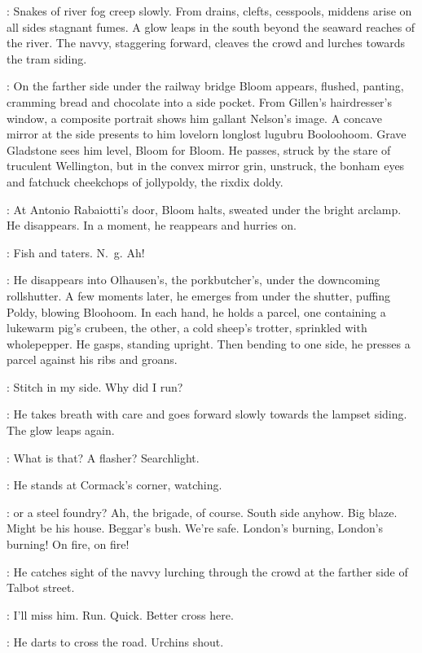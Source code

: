 :
Snakes of river fog creep slowly.
From drains,
clefts,
cesspools,
middens
arise on all sides stagnant fumes.
A glow leaps in the south
beyond the seaward reaches of the river.
The navvy,
staggering forward,
cleaves the crowd
and lurches towards the tram siding.

:
On the farther side under the railway bridge Bloom appears,
flushed,
panting,
cramming bread and chocolate into a side pocket.
From Gillen's hairdresser's window,
a composite portrait
shows him gallant Nelson's image.
A concave mirror at the side presents to him lovelorn longlost lugubru Booloohoom.
Grave Gladstone sees him level,
Bloom for Bloom.
He passes,
struck by the stare of truculent Wellington,
but in the convex mirror grin,
unstruck,
the bonham eyes and fatchuck cheekchops of jollypoldy,
the rixdix doldy.

:
At Antonio Rabaiotti's door,
Bloom halts,
sweated under the bright arclamp.
He disappears.
In a moment,
he reappears and hurries on.

\Bloom:
Fish and taters.
N.~g.
Ah!

:
He disappears into Olhausen's,
the porkbutcher's,
under the downcoming rollshutter.
A few moments later,
he emerges from under the shutter,
puffing Poldy,
blowing Bloohoom.
In each hand,
he holds a parcel,
one containing a lukewarm pig's crubeen,
the other,
a cold sheep's trotter,
sprinkled with wholepepper.
He gasps,
standing upright.
Then bending to one side,
he presses a parcel against his ribs and groans.

\Bloom:
Stitch in my side.
Why did I run?

:
He takes breath with care and goes forward slowly towards the lampset siding.
The glow leaps again.

\Bloom:
What is that? A flasher? Searchlight.

:
He stands at Cormack's corner,
watching.

\Bloom:
 or a steel foundry?
Ah,
the brigade,
of course.
South side anyhow.
Big blaze.
Might be his house.
Beggar's bush.
We're safe.
London's burning,
London's burning!
On fire,
on fire!

:
He catches sight of the navvy lurching through the crowd
at the farther side of Talbot street.

\Bloom:
I'll miss him.
Run.
Quick.
Better cross here.

:
He darts to cross the road.
Urchins shout.

